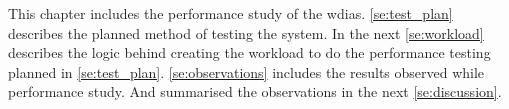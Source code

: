 
This chapter includes the performance study of the \acrshort{wdias}. \cref{se:test_plan} describes the planned method of testing the system.
In the next \cref{se:workload} describes the logic behind creating the workload to do the performance testing planned in \cref{se:test_plan}.
\cref{se:observations} includes the results observed while performance study. And summarised the observations in the next \cref{se:discussion}.
